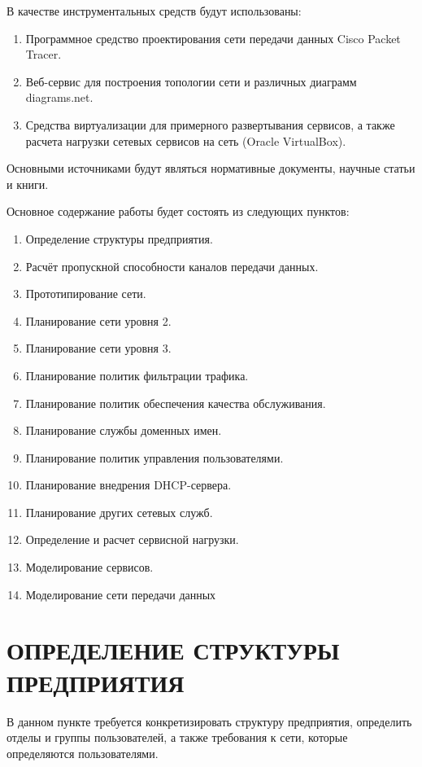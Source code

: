\documentclass[14pt, a4paper]{extarticle}
\begin{document}
В качестве инструментальных средств будут использованы:
\begin{enumerate}
\item Программное средство проектирования сети передачи данных Cisco Packet Tracer.
\item Веб-сервис для построения топологии сети и различных диаграмм
  diagrams.net.
\item Средства виртуализации для примерного развертывания сервисов, а
  также расчета нагрузки сетевых сервисов на сеть (Oracle VirtualBox).
\end{enumerate}

Основными источниками будут являться нормативные документы, научные
статьи и книги.

Основное содержание работы будет состоять из следующих пунктов:
\begin{enumerate}
\item Определение структуры предприятия.
\item Расчёт пропускной способности каналов передачи данных.
\item Прототипирование сети.
\item Планирование сети уровня 2.
\item Планирование сети уровня 3.
\item Планирование политик фильтрации трафика.
\item Планирование политик обеспечения качества обслуживания.
\item Планирование службы доменных имен.
\item Планирование политик управления пользователями.
\item Планирование внедрения DHCP-сервера.
\item Планирование других сетевых служб.
\item Определение и расчет сервисной нагрузки.
\item Моделирование сервисов.
\item Моделирование сети передачи данных
\end{enumerate}

\section{ОПРЕДЕЛЕНИЕ СТРУКТУРЫ ПРЕДПРИЯТИЯ}

В данном пункте требуется конкретизировать структуру предприятия,
определить отделы и группы пользователей, а также требования к сети,
которые определяются пользователями.
\end{document}
